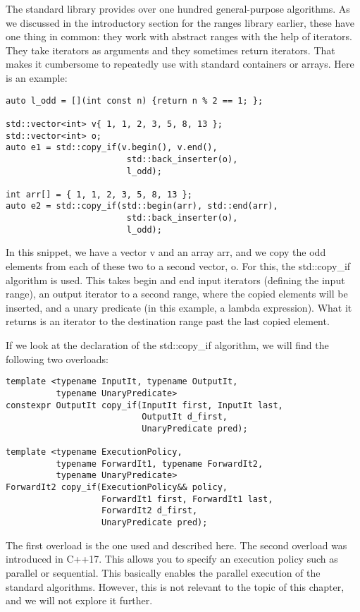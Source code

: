 The standard library provides over one hundred general-purpose algorithms. As we discussed in the introductory section for the ranges library earlier, these have one thing in common: they work with abstract ranges with the help of iterators. They take iterators as arguments and they sometimes return iterators. That makes it cumbersome to repeatedly use with standard containers or arrays. Here is an example:

\begin{lstlisting}[style=styleCXX]
auto l_odd = [](int const n) {return n % 2 == 1; };

std::vector<int> v{ 1, 1, 2, 3, 5, 8, 13 };
std::vector<int> o;
auto e1 = std::copy_if(v.begin(), v.end(),
						std::back_inserter(o),
						l_odd);
						
int arr[] = { 1, 1, 2, 3, 5, 8, 13 };
auto e2 = std::copy_if(std::begin(arr), std::end(arr),
						std::back_inserter(o),
						l_odd);
\end{lstlisting}

In this snippet, we have a vector v and an array arr, and we copy the odd elements from each of these two to a second vector, o. For this, the std::copy\_if algorithm is used. This takes begin and end input iterators (defining the input range), an output iterator to a second range, where the copied elements will be inserted, and a unary predicate (in this example, a lambda expression). What it returns is an iterator to the destination range past the last copied element.

If we look at the declaration of the std::copy\_if algorithm, we will find the following two overloads:

\begin{lstlisting}[style=styleCXX]
template <typename InputIt, typename OutputIt,
		  typename UnaryPredicate>
constexpr OutputIt copy_if(InputIt first, InputIt last,
						   OutputIt d_first,
						   UnaryPredicate pred);
						   
template <typename ExecutionPolicy,
		  typename ForwardIt1, typename ForwardIt2,
		  typename UnaryPredicate>
ForwardIt2 copy_if(ExecutionPolicy&& policy,
				   ForwardIt1 first, ForwardIt1 last,
				   ForwardIt2 d_first,
				   UnaryPredicate pred);
\end{lstlisting}

The first overload is the one used and described here. The second overload was introduced in C++17. This allows you to specify an execution policy such as parallel or sequential.
This basically enables the parallel execution of the standard algorithms. However, this is not relevant to the topic of this chapter, and we will not explore it further.

